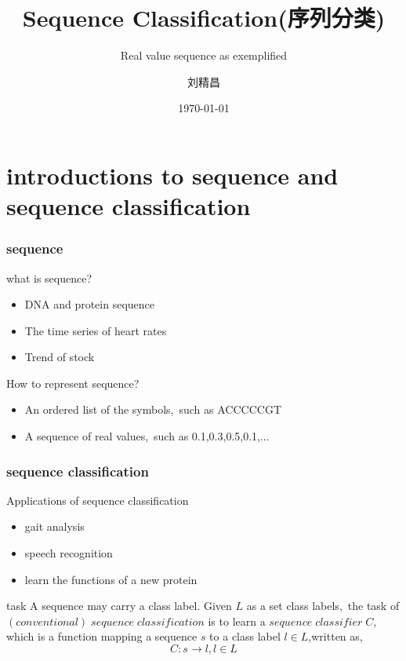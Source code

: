 \documentclass[xetex,mathserif,serif]{beamer}
\begin{document}
\title[Weekly report] %
{Sequence Classification(序列分类)}
\subtitle{Real value sequence as exemplified}
\author{刘精昌 } %
\date{\today}
\subject{Weekly report}

\begin{frame}
\titlepage
\end{frame}

\section{introductions to sequence and sequence classification}

\begin{frame}
\frametitle{sequence}
\begin{exampleblock}{what is sequence?}
\begin{itemize}
  \item DNA and protein sequence
  \item The time series of heart rates
  \item Trend of stock
\end{itemize}
\end{exampleblock}

\begin{block}{How to represent sequence?}
\begin{itemize}
  \item An ordered list of the symbols,\ such as ACCCCCGT
  \item A sequence of real values,\ such as 0.1,0.3,0.5,0.1,...
\end{itemize}
\end{block}
\end{frame}

\begin{frame}
\frametitle{sequence classification}
\begin{exampleblock}{Applications of sequence classification}
\begin{itemize}
  \item gait analysis
  \item speech recognition
  \item learn the functions of a new protein
\end{itemize}
\end{exampleblock}
\pause
\begin{block}{task}
A sequence may carry a class label. Given $L$ as a set class labels,\ the task of $(conventional) \; sequence \; classification$ is to learn a $sequence \; classifier \; C$, which is a function mapping a sequence $s$ to a class label $l \in L$,written as,\[C:s \to l,l \in L\]
\end{block}
\end{frame}
\end{document}
